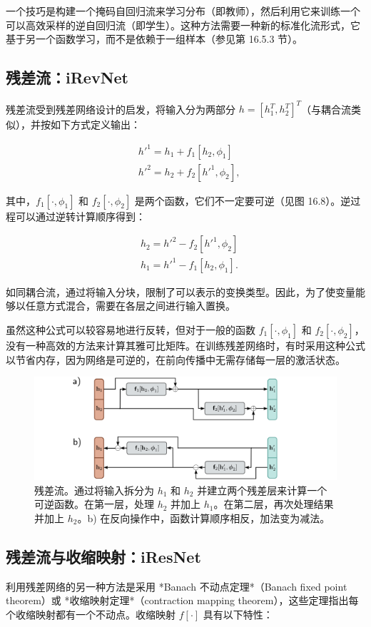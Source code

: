 一个技巧是构建一个掩码自回归流来学习分布（即教师），然后利用它来训练一个可以高效采样的逆自回归流（即学生）。这种方法需要一种新的标准化流形式，它基于另一个函数学习，而不是依赖于一组样本（参见第 16.5.3 节）。

\subsection{残差流：iRevNet}
残差流受到残差网络设计的启发，将输入分为两部分 \(h = [h^T_1, h^T_2]^T\)（与耦合流类似），并按如下方式定义输出：

\begin{align}
&h'^1 = h_1 + f_1[h_2, \phi_1] \\
&h'^2 = h_2 + f_2[h'^1, \phi_2], 
\end{align} 


其中，\(f_1[\cdot, \phi_1]\) 和 \(f_2[\cdot, \phi_2]\) 是两个函数，它们不一定要可逆（见图 16.8）。逆过程可以通过逆转计算顺序得到：


\begin{align}
&h_2 = h'^2 - f_2[h'^1, \phi_2] \\
&h_1 = h'^1 - f_1[h_2, \phi_1]. 
\end{align} 


如同耦合流，通过将输入分块，限制了可以表示的变换类型。因此，为了使变量能够以任意方式混合，需要在各层之间进行输入置换。

虽然这种公式可以较容易地进行反转，但对于一般的函数 \(f_1[\cdot, \phi_1]\) 和 \(f_2[\cdot, \phi_2]\)，没有一种高效的方法来计算其雅可比矩阵。在训练残差网络时，有时采用这种公式以节省内存，因为网络是可逆的，在前向传播中无需存储每一层的激活状态。

\begin{figure}[ht!]
\centering
\includegraphics[width=0.7\linewidth]{png/chapter16/FlowResidual.png}
\caption{残差流。通过将输入拆分为 \(h_1\) 和 \(h_2\) 并建立两个残差层来计算一个可逆函数。在第一层，处理 \(h_2\) 并加上 \(h_1\)。在第二层，再次处理结果并加上 \(h_2\)。b) 在反向操作中，函数计算顺序相反，加法变为减法。}
\end{figure}


\subsection{残差流与收缩映射：iResNet}
利用残差网络的另一种方法是采用 *Banach 不动点定理*（Banach fixed point theorem）或 *收缩映射定理*（contraction mapping theorem），这些定理指出每个收缩映射都有一个不动点。收缩映射 \(f[\cdot]\) 具有以下特性：

